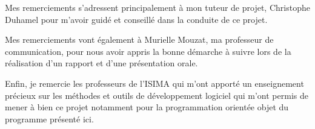 Mes remerciements s'adressent principalement à mon tuteur de projet,  Christophe Duhamel pour m'avoir guidé et conseillé dans la conduite de ce projet.

Mes remerciements vont également à Murielle Mouzat, ma professeur de communication, pour nous avoir appris la bonne démarche à suivre lors de la réalisation d'un rapport et d'une présentation orale.

Enfin, je remercie les professeurs de l'ISIMA qui m'ont apporté un enseignement précieux sur les méthodes et outils de développement logiciel qui m'ont permis de mener à bien ce projet notamment pour la programmation orientée objet du programme présenté ici.